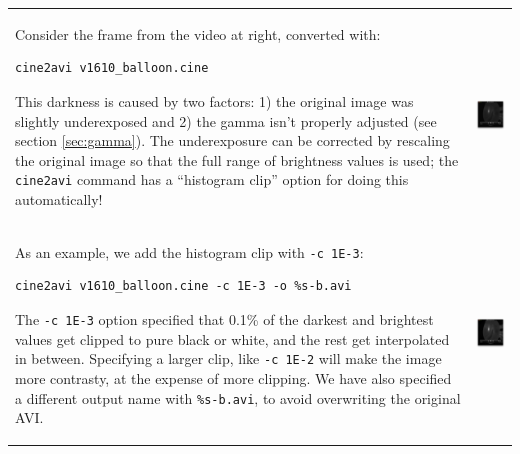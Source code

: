 \documentclass[11pt]{amsart}
\begin{document}
\vspace{0.5cm}
\begin{tabular}{p{4in}p{2in}}
Consider the frame from the video at right, converted with:
\vspace{0.5cm}
\begin{verbatim}
cine2avi v1610_balloon.cine
\end{verbatim}
\vspace{0.5cm}
This darkness is caused by two factors: 1) the original image was slightly underexposed and 2) the gamma isn't properly adjusted (see  section \ref{sec:gamma}).
The underexposure can be corrected by rescaling the original image so that the full range of brightness values is used; the \texttt{cine2avi} command has a ``histogram clip'' option for doing this automatically!
&
\vspace{-10pt}\includegraphics[width=2in]{figures/cine2avi.png}
\\
As an example, we add the histogram clip with \texttt{-c 1E-3}:
\vspace{0.5cm}
\begin{verbatim}
cine2avi v1610_balloon.cine -c 1E-3 -o %s-b.avi
\end{verbatim}
\vspace{0.5cm}
The \texttt{-c 1E-3} option specified that 0.1\% of the darkest and brightest values get clipped to pure black or white, and the rest get interpolated in between.  Specifying a larger clip, like \texttt{-c 1E-2} will make the image more contrasty, at the expense of more clipping.
We have also specified a different output name with \texttt{\%s-b.avi}, to avoid overwriting the original AVI.
&
\vspace{-10pt}\includegraphics[width=2in]{figures/cine2avi_b.png}

\end{tabular}
\end{document}
